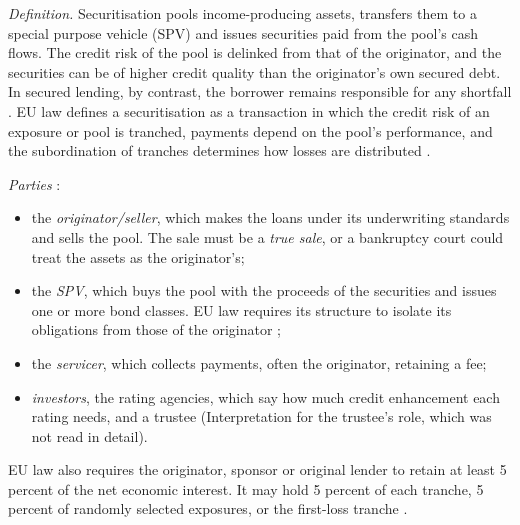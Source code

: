 \begin{qfdefinition}\label{def:securitisation-process}
 \emph{Definition.} Securitisation pools income-producing assets, transfers them to a special purpose vehicle (SPV) and issues securities paid from the pool's cash flows. The credit risk of the pool is delinked from that of the originator, and the securities can be of higher credit quality than the originator's own secured debt. In secured lending, by contrast, the borrower remains responsible for any shortfall \citep[pp.~5--6]{fabozzi-kothari-securitisation-2008}. EU law defines a securitisation as a transaction in which the credit risk of an exposure or pool is tranched, payments depend on the pool's performance, and the subordination of tranches determines how losses are distributed \citep[Art.~2(1)]{eu-2017-2402-securitisation}.

\emph{Parties} \citep[pp.~8--12]{fabozzi-kothari-securitisation-2008}:
\begin{itemize}
\item the \emph{originator/seller}, which makes the loans under its underwriting standards and sells the pool. The sale must be a \emph{true sale}, or a bankruptcy court could treat the assets as the originator's;
\item the \emph{SPV}, which buys the pool with the proceeds of the securities and issues one or more bond classes. EU law requires its structure to isolate its obligations from those of the originator \citep[Art.~2(2)]{eu-2017-2402-securitisation};
\item the \emph{servicer}, which collects payments, often the originator, retaining a fee;
\item \emph{investors}, the rating agencies, which say how much credit enhancement each rating needs, and a trustee (Interpretation for the trustee's role, which was not read in detail).
\end{itemize}
EU law also requires the originator, sponsor or original lender to retain at least 5 percent of the net economic interest. It may hold 5 percent of each tranche, 5 percent of randomly selected exposures, or the first-loss tranche \citep[Art.~6]{eu-2017-2402-securitisation}.


\end{qfdefinition}
